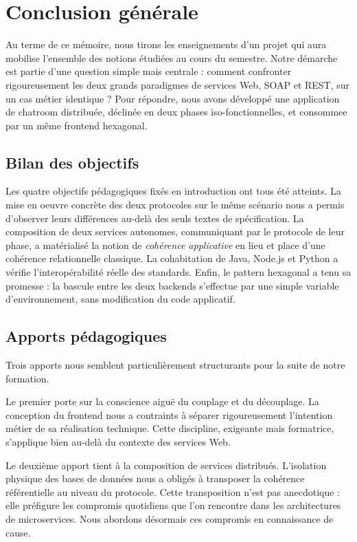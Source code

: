 \chapter*{Conclusion générale}

Au terme de ce mémoire, nous tirons les enseignements d'un projet qui aura mobilise l'ensemble des notions étudiées au cours du semestre. Notre démarche est partie d'une question simple mais centrale : comment confronter rigoureusement les deux grands paradigmes de services Web, SOAP et REST, sur un cas métier identique ? Pour répondre, nous avons développé une application de chatroom distribuée, déclinée en deux phases iso-fonctionnelles, et consommee par un même frontend hexagonal.

\section*{Bilan des objectifs}

Les quatre objectifs pédagogiques fixés en introduction ont tous été atteints. La mise en oeuvre concrète des deux protocoles sur le même scénario nous a permis d'observer leurs différences au-delà des seuls textes de spécification. La composition de deux services autonomes, communiquant par le protocole de leur phase, a matérialisé la notion de \emph{cohérence applicative} en lieu et place d'une cohérence relationnelle classique. La cohabitation de Java, Node.js et Python a vérifie l'interopérabilité réelle des standards. Enfin, le pattern hexagonal a tenu sa promesse : la bascule entre les deux backends s'effectue par une simple variable d'environnement, sans modification du code applicatif.

\section*{Apports pédagogiques}

Trois apports nous semblent particulièrement structurants pour la suite de notre formation.

Le premier porte sur la conscience aiguë du couplage et du découplage. La conception du frontend nous a contraints à séparer rigoureusement l'intention métier de sa réalisation technique. Cette discipline, exigeante mais formatrice, s'applique bien au-delà du contexte des services Web.

Le deuxième apport tient à la composition de services distribués. L'isolation physique des bases de données nous a obligés à transposer la cohérence référentielle au niveau du protocole. Cette transposition n'est pas anecdotique : elle préfigure les compromis quotidiens que l'on rencontre dans les architectures de microservices. Nous abordons désormais ces compromis en connaissance de cause.

